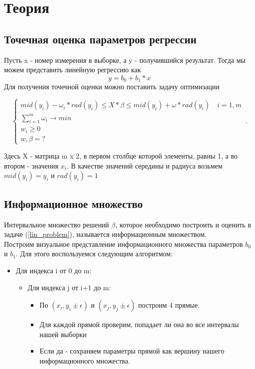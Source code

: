\documentclass[12pt,a4paper]{article}
\begin{document}
\section{Теория}

\subsection{Точечная оценка параметров регрессии}
Пусть x - номер измерения в выборке, а y - получившийся результат. Тогда мы можем представить линейную регрессию как 
\[ y = b_0 + b_1*x\]
Для получения точечной оценки можно поставить задачу оптимизации

\begin{equation}
    \begin{cases}
    mid(y_i) - \omega_i * rad(y_i) \leq X*\beta \leq mid(y_i) + \omega*rad(y_i)  \quad     i=1,m \\
     \sum_{i=1}^{m} \omega_i \to  min \\
    w_i \geq 0 \\
    w, \beta = ?
    
      
    \end{cases}\,.
\end{equation}


Здесь X - матрица m x 2, в первом столбце которой элементы, равны 1, а во втором - значения $x_i$. В качестве значений середины и радиуса возьмем $mid(y_i) = y_i$ и $rad(y_i) = 1$

\subsection{Информационное множество}
Интервальное множество решений $\beta$, которое необходимо построить и оценить в задаче (\ref{lin_problem}), называется информационным множеством. \\
Построим визуальное представление информационного множества параметров $b_0$ и $b_1$. Для этого воспользуемся следующим алгоритмом:
\begin{itemize}
    \item Для индекса i от 0 до m:
    \begin{itemize}
        \item Для индекса j от i+1 до m:
        \begin{itemize}
            \item По $ (x_i, y_i \pm \epsilon)$ и $ (x_j, y_j \pm \epsilon)$ построим 4 прямые.
            \item Для каждой прямой проверим, попадает ли она во все интервалы нашей выборки
            \item Если да - сохраняем параметры прямой как вершину нашего информационного множества.
        \end{itemize}
    \end{itemize}
\end{itemize}
\end{document}
